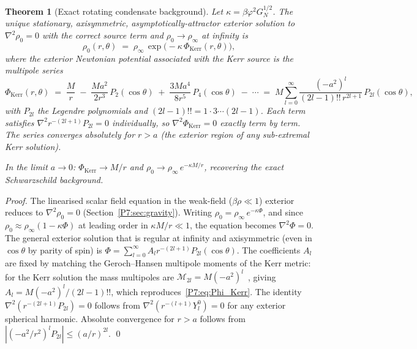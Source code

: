 \documentclass[11pt,a4paper]{article}
\newtheorem{theorem}{Theorem}[section]
\theoremstyle{definition}
\theoremstyle{remark}
\newcommand{\vp}{\varphi}
\newcommand{\rinfty}{\rho_{\infty}}
\begin{document}
\begin{theorem}[Exact rotating condensate background]
\label{P7:thm:rotating}
Let $\kappa = \beta\vp^2 G_N^{1/2}$.
The unique stationary, axisymmetric, asymptotically-attractor exterior
solution to $\nabla^2\rho_0 = 0$ with the correct source term and
$\rho_0\to\rinfty$ at infinity is
\begin{equation}
  \rho_0(r,\theta)
  \;=\; \rinfty\,\exp\!\bigl(-\kappa\,\Phi_{\mathrm{Kerr}}(r,\theta)\bigr),
  \label{P7:eq:rho_Kerr_exact}
\end{equation}
where the exterior Newtonian potential associated with the Kerr
source is the multipole series
\begin{equation}
  \boxed{\Phi_{\mathrm{Kerr}}(r,\theta)
  \;=\; \frac{M}{r}
  \;-\; \frac{M a^2}{2r^3}\,P_2(\cos\theta)
  \;+\; \frac{3M a^4}{8r^5}\,P_4(\cos\theta)
  \;-\; \cdots
  \;=\; M\sum_{l=0}^{\infty}
        \frac{(-a^2)^l}{(2l-1)!!\,r^{2l+1}}\,P_{2l}(\cos\theta),}
  \label{P7:eq:Phi_Kerr}
\end{equation}
with $P_{2l}$ the Legendre polynomials and $(2l-1)!! = 1\cdot3\cdots(2l-1)$.
Each term satisfies $\nabla^2 r^{-(2l+1)}P_{2l} = 0$ individually,
so $\nabla^2\Phi_{\mathrm{Kerr}} = 0$ exactly term by term.
The series converges absolutely for $r > a$ (the exterior region
of any sub-extremal Kerr solution).

In the limit $a\to0$: $\Phi_{\mathrm{Kerr}}\to M/r$ and
$\rho_0\to\rinfty\,e^{-\kappa M/r}$, recovering the exact
Schwarzschild background.
\end{theorem}

\begin{proof}
The linearised scalar field equation in the weak-field ($\beta\rho\ll1$)
exterior reduces to $\nabla^2\rho_0 = 0$ (Section~\ref{P7:sec:gravity}).
Writing $\rho_0=\rinfty\,e^{-\kappa\Phi}$, and since $\rho_0\approx\rinfty(1-\kappa\Phi)$
at leading order in $\kappa M/r\ll1$, the equation becomes $\nabla^2\Phi = 0$.
The general exterior solution that is regular at infinity and axisymmetric
(even in $\cos\theta$ by parity of spin) is
$\Phi = \sum_{l=0}^\infty A_l r^{-(2l+1)} P_{2l}(\cos\theta)$.
The coefficients $A_l$ are fixed by matching the Geroch--Hansen multipole
moments of the Kerr metric: for the Kerr solution the mass multipoles are
$\mathcal{M}_{2l} = M(-a^2)^l$~\cite{Jacobson1995}, giving
$A_l = M(-a^2)^l/(2l-1)!!$, which reproduces~\eqref{P7:eq:Phi_Kerr}.
The identity $\nabla^2(r^{-(2l+1)}P_{2l})=0$ follows from
$\nabla^2(r^{-(l+1)}Y_l^0)=0$ for any exterior spherical harmonic.
Absolute convergence for $r>a$ follows from $|(-a^2/r^2)^l P_{2l}|\leq(a/r)^{2l}$.
\qed
\end{proof}
\end{document}
